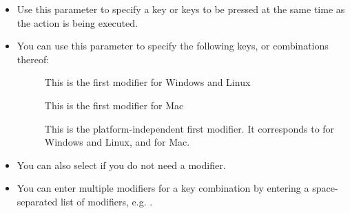 \begin{itemize}
\item Use this parameter to specify a key or keys to be pressed at the same time as the action is being executed. 
\item You can use this parameter to specify the following keys, or combinations thereof:
\begin{description}
\item []{}
\item []{This is the first modifier for Windows and Linux}
\item []{This is the first modifier for Mac}
\item []{This is the platform-independent first modifier. It corresponds to  for Windows and Linux, and  for Mac.}
\item []{}
\item []{}
\end{description}
\item You can also select  if you do not need a modifier.
\item You can enter multiple modifiers for a key combination by entering a space-separated list of modifiers, e.g. .
\end{itemize}

